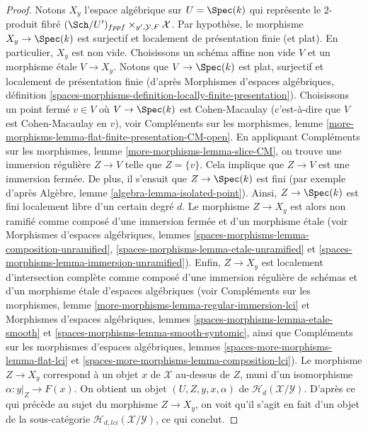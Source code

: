 \begin{proof}
\medskip\noindent
Notons $X_y$ l'espace algébrique sur $U = \Spec(k)$
qui représente le $2$-produit fibré
$(\Sch/U')_{fppf} \times_{y', \mathcal{Y}, F} \mathcal{X}$.
Par hypothèse, le morphisme $X_y \to \Spec(k)$ est surjectif et
localement de présentation finie (et plat). En particulier, $X_y$ est
non vide. Choisissons un schéma affine non vide $V$ et un morphisme étale
$V \to X_y$. Notons que $V \to \Spec(k)$ est plat, surjectif
et localement de présentation finie (d'après
Morphismes d'espaces algébriques,
définition \ref{spaces-morphisms-definition-locally-finite-presentation}).
Choisissons un point fermé $v \in V$ où $V \to \Spec(k)$ est Cohen-Macaulay
(c'est-à-dire que $V$ est Cohen-Macaulay en $v$), voir
Compléments sur les morphismes,
lemme \ref{more-morphisms-lemma-flat-finite-presentation-CM-open}.
En appliquant
Compléments sur les morphismes,
lemme \ref{more-morphisms-lemma-slice-CM},
on trouve une immersion régulière $Z \to V$ telle que $Z = \{v\}$.
Cela implique que $Z \to V$ est une immersion fermée. De plus, il s'ensuit que
$Z \to \Spec(k)$ est fini (par exemple d'après
Algèbre, lemme \ref{algebra-lemma-isolated-point}).
Ainsi, $Z \to \Spec(k)$ est fini localement libre d'un certain degré $d$.
Le morphisme $Z \to X_y$ est alors non ramifié comme composé
d'une immersion fermée et d'un morphisme étale
(voir
Morphismes d'espaces algébriques, lemmes \ref{spaces-morphisms-lemma-composition-unramified},
\ref{spaces-morphisms-lemma-etale-unramified} et
\ref{spaces-morphisms-lemma-immersion-unramified}).
Enfin, $Z \to X_y$ est localement d'intersection complète
comme composé d'une immersion régulière de schémas et d'un morphisme
étale d'espaces algébriques (voir
Compléments sur les morphismes, lemme \ref{more-morphisms-lemma-regular-immersion-lci}
et
Morphismes d'espaces algébriques, lemmes \ref{spaces-morphisms-lemma-etale-smooth} et
\ref{spaces-morphisms-lemma-smooth-syntomic}, ainsi que
Compléments sur les morphismes d'espaces algébriques,
lemmes \ref{spaces-more-morphisms-lemma-flat-lci} et
\ref{spaces-more-morphisms-lemma-composition-lci}).
Le morphisme $Z \to X_y$ correspond à un objet $x$ de $\mathcal{X}$
au-dessus de $Z$, muni d'un isomorphisme $\alpha : y|_Z \to F(x)$.
On obtient un objet $(U, Z, y, x, \alpha)$ de
$\mathcal{H}_d(\mathcal{X}/\mathcal{Y})$. D'après ce qui précède au sujet
du morphisme $Z \to X_y$, on voit qu'il s'agit en fait d'un objet de la
sous-catégorie $\mathcal{H}_{d, lci}(\mathcal{X}/\mathcal{Y})$, ce qui conclut.
\end{proof}




















